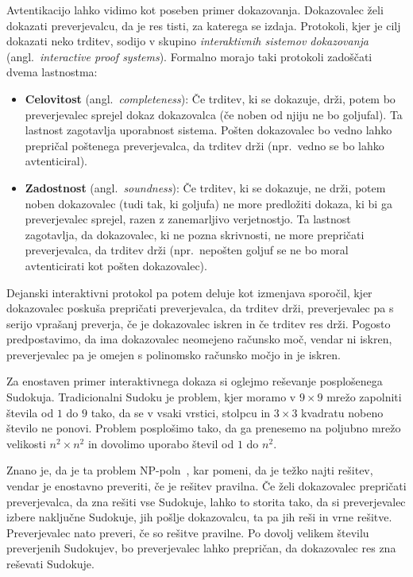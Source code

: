 Avtentikacijo lahko vidimo kot poseben primer dokazovanja. Dokazovalec želi dokazati preverjevalcu, da
je res tisti, za katerega se izdaja. Protokoli, kjer je cilj dokazati neko trditev, sodijo v skupino
\textit{interaktivnih sistemov dokazovanja} (angl.\ \textit{interactive proof systems}). Formalno
morajo taki protokoli zadoščati dvema lastnostma:
\begin{itemize}
    \item \textbf{Celovitost} (angl.\ \textit{completeness}): Če trditev, ki se dokazuje,
        drži, potem bo preverjevalec sprejel dokaz dokazovalca (če noben od njiju ne bo goljufal).
        Ta lastnost zagotavlja uporabnost sistema. Pošten dokazovalec bo vedno lahko prepričal
        poštenega preverjevalca, da trditev drži (npr.\ vedno se bo lahko avtenticiral).
    \item \textbf{Zadostnost} (angl.\ \textit{soundness}): Če trditev, ki se dokazuje, ne
        drži, potem noben dokazovalec (tudi tak, ki goljufa) ne more predložiti dokaza, ki bi
        ga preverjevalec sprejel, razen z zanemarljivo verjetnostjo. Ta lastnost zagotavlja, da
        dokazovalec, ki ne pozna skrivnosti, ne more prepričati preverjevalca, da trditev drži (npr.\
        nepošten goljuf se ne bo moral avtenticirati kot pošten dokazovalec).
\end{itemize}
Dejanski interaktivni protokol pa potem deluje kot izmenjava sporočil, kjer dokazovalec poskuša
prepričati preverjevalca, da trditev drži, preverjevalec pa s serijo vprašanj preverja, če je
dokazovalec iskren in če trditev res drži. Pogosto predpostavimo, da ima dokazovalec neomejeno
računsko moč, vendar ni iskren, preverjevalec pa je omejen s polinomsko računsko močjo in je iskren.

\begin{primer}
    Za enostaven primer interaktivnega dokaza si oglejmo reševanje posplošenega Sudokuja. Tradicionalni
    Sudoku je problem, kjer moramo v $9 \times 9$ mrežo zapolniti števila od $1$ do $9$ tako, da se v vsaki
    vrstici, stolpcu in $3 \times 3$ kvadratu nobeno število ne ponovi. Problem posplošimo tako, da
    ga prenesemo na poljubno mrežo velikosti $n^2 \times n^2$ in dovolimo uporabo števil od $1$ do $n^2$.

    Znano je, da je ta problem NP-poln~\cite{yato2003sudoku}, kar pomeni, da je težko najti rešitev,
    vendar je enostavno preveriti, če je rešitev pravilna. Če želi dokazovalec prepričati preverjevalca,
    da zna rešiti vse Sudokuje, lahko to storita tako, da si preverjevalec izbere naključne Sudokuje,
    jih pošlje dokazovalcu, ta pa jih reši in vrne rešitve. Preverjevalec nato preveri, če so rešitve pravilne.
    Po dovolj velikem številu preverjenih Sudokujev, bo preverjevalec lahko prepričan, da dokazovalec
    res zna reševati Sudokuje.
\end{primer}

